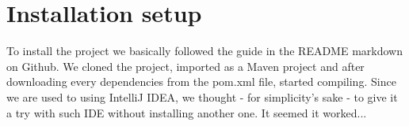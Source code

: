 \chapter{Installation setup}
\label{cha:installation}

To install the project we basically followed the guide in the README markdown on Github. We cloned the project, imported as a Maven project and after downloading every dependencies from the pom.xml file, started compiling. Since we are used to using IntelliJ IDEA, we thought - for simplicity's sake - to give it a try with such IDE without installing another one. It seemed it worked...



